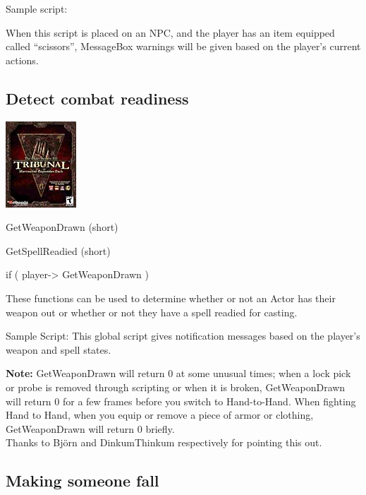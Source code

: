 Sample script:

When this script is placed on an NPC, and the player has an item
equipped called ``scissors'', MessageBox warnings will be given based on
the player's current actions.



\hypertarget{detect-combat-readiness}{%
\subsection{Detect combat readiness}\label{detect-combat-readiness}}

\includegraphics{media/image6.png}

GetWeaponDrawn (short)

GetSpellReadied (short)

if ( player-> GetWeaponDrawn )

These functions can be used to determine whether or not an Actor has
their weapon out or whether or not they have a spell readied for
casting.

Sample Script: This global script gives notification messages based on
the player's weapon and spell states.



\textbf{Note:} GetWeaponDrawn will return 0 at some unusual times; when
a lock pick or probe is removed through scripting or when it is broken,
GetWeaponDrawn will return 0 for a few frames before you switch to
Hand-to-Hand. When fighting Hand to Hand, when you equip or remove a
piece of armor or clothing, GetWeaponDrawn will return 0 briefly.\\
Thanks to Björn and DinkumThinkum respectively for pointing this out.

\hypertarget{section-7}{%
\subsection{}\label{section-7}}

\hypertarget{making-someone-fall}{%
\subsection{Making someone fall}\label{making-someone-fall}}

